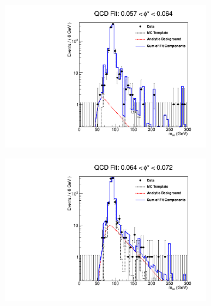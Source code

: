 \begin{figure}[!htbp]
    \centering
    \begin{subfigure}[b]{\SideBySidePlotWidth}
        \includegraphics[width=\linewidth]{figures/qcd_fits/qcd_fit_plot_for_13.pdf}
        \label{fig:qcd_fit_13}
    \end{subfigure}%
    \begin{subfigure}[b]{\SideBySidePlotWidth}
        \includegraphics[width=\linewidth]{figures/qcd_fits/qcd_fit_plot_for_14.pdf}
        \label{fig:qcd_fit_14}
    \end{subfigure}
    \begin{subfigure}[b]{\SideBySidePlotWidth}

\end{subfigure}
\end{figure}
